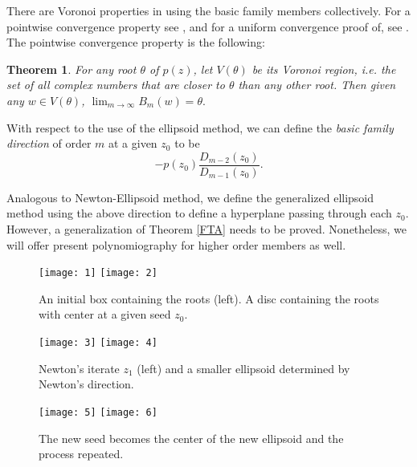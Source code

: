 \documentclass{article}
\newtheorem{theorem}{Theorem}
\begin{document}
There are Voronoi properties in using the basic family members collectively.  For a pointwise convergence property see \cite{kalbook}, and for a uniform convergence proof of, see \cite{KalDCG}. The pointwise convergence property is the following:

\begin{theorem} \label{thm2} For any root $\theta$ of $p(z)$, let $V(\theta)$ be its Voronoi region, i.e. the set of all complex numbers that are closer to $\theta$ than any other root. Then given any $w \in V(\theta)$,  $\lim_{m \to \infty} B_m(w)=\theta.$
\end{theorem}

With respect to the use of the ellipsoid method, we can define the \textit{basic family direction} of order $m$ at a given $z_0$ to be
$$-p(z_0) \frac{D_{m-2}(z_0)} {D_{m-1}(z_0)}.$$

Analogous to Newton-Ellipsoid method, we define the generalized ellipsoid method using the above direction to define a hyperplane passing through each $z_0$.  However, a generalization of Theorem \ref{FTA} needs to be proved. Nonetheless, we will offer present polynomiography for higher order members as well.

\begin{figure}
\begin{center}
\texttt{[image: 1]}
\texttt{[image: 2]}\\
\end{center}
\begin{center}
\caption{An initial box containing the roots (left). A disc containing the roots with center at a given seed $z_0$.} \label{Fig1}
\end{center}
\end{figure}


\begin{figure}
\begin{center}
\texttt{[image: 3]}
\texttt{[image: 4]}\\
\end{center}
\begin{center}
\caption{Newton's iterate $z_1$ (left) and a smaller ellipsoid determined by Newton's direction.} \label{Fig2}
\end{center}
\end{figure}

\begin{figure}
\begin{center}
\texttt{[image: 5]}
\texttt{[image: 6]}\\
\end{center}
\begin{center}
\caption{The new seed becomes the center of the new ellipsoid and the process repeated.} \label{Fig3}
\end{center}
\end{figure}
\end{document}
